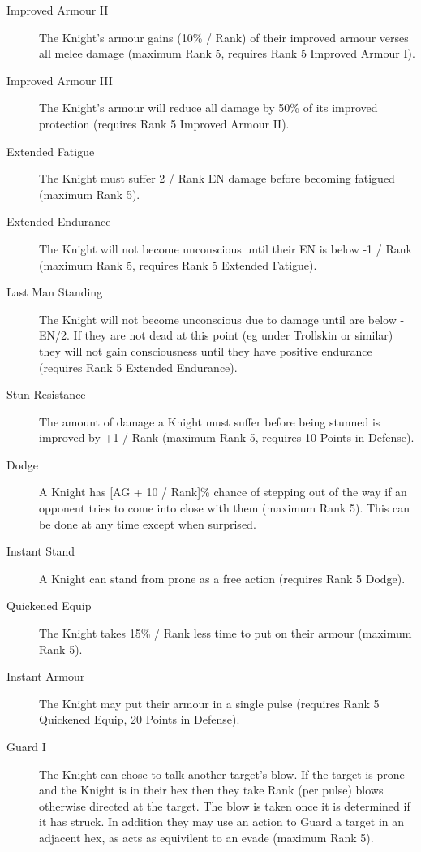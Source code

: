 \documentclass[a4paper]{article}
\begin{document}
\begin{multicols*}{3}
\begin{description}
\item[Improved Armour II] The Knight's armour gains (10\% / Rank) of
their improved armour verses all melee damage (maximum Rank 5,
requires Rank 5 Improved Armour I).

\item[Improved Armour III] The Knight's armour will reduce all damage
by 50\% of its improved protection (requires Rank 5 Improved Armour II).

\item[Extended Fatigue] The Knight must suffer 2 / Rank EN damage
before becoming fatigued (maximum Rank 5).

\item[Extended Endurance] The Knight will not become unconscious until
their EN is below -1 / Rank (maximum Rank 5, requires Rank 5 Extended
Fatigue).

\item[Last Man Standing] The Knight will not become unconscious due to
damage until are below -EN/2.  If they are not dead at this point (eg
under Trollskin or similar) they will not gain consciousness until
they have positive endurance (requires Rank 5 Extended Endurance).

\item[Stun Resistance] The amount of damage a Knight must suffer
before being stunned is improved by +1 / Rank (maximum Rank 5,
requires 10 Points in Defense).

\item[Dodge] A Knight has [AG + 10 / Rank]\% chance of stepping out of
the way if an opponent tries to come into close with them (maximum
Rank 5).  This can be done at any time except when surprised.

\item[Instant Stand] A Knight can stand from prone as a free action
(requires Rank 5 Dodge).

\item[Quickened Equip] The Knight takes 15\% / Rank less time to put
on their armour (maximum Rank 5).

\item[Instant Armour] The Knight may put their armour in a single
pulse (requires Rank 5 Quickened Equip, 20 Points in Defense).

\item[Guard I] The Knight can chose to talk another target's blow.  If
the target is prone and the Knight is in their hex then they take Rank
(per pulse) blows otherwise directed at the target.  The blow is taken
once it is determined if it has struck.  In addition they may use an
action to Guard a target in an adjacent hex, as acts as equivilent to
an evade (maximum Rank 5).


\end{description}
\end{multicols*}
\end{document}
